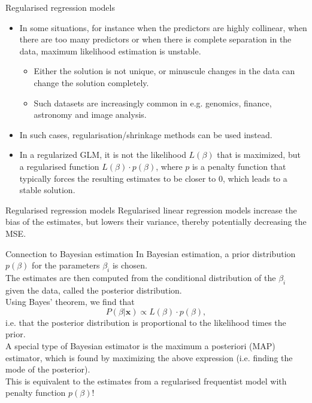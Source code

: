 \documentclass[10pt,handout]{beamer}
\begin{document}
\begin{frame}{Regularised regression models}
\begin{itemize}
\item In some situations, for instance when the predictors are highly collinear, when there are too many predictors or when there is complete separation in the data, maximum likelihood estimation is unstable.\pause
\begin{itemize}
\item Either the solution is not unique, or minuscule changes in the data can change the solution completely.\pause
\item Such datasets are increasingly common in e.g. genomics, finance, astronomy and image analysis.\\[3mm]\pause
\end{itemize}

\item In such cases, {\color{uured}regularisation/shrinkage methods} can be used instead.\\[3mm]\pause
\item In a regularized GLM, it is not the likelihood $L(\beta)$ that is maximized, but a {\color{uured}regularised} function $L(\beta) \cdot p(\beta)$, where $p$ is a penalty function that typically forces the resulting estimates to be closer to 0, which leads to a stable solution.
\end{itemize}
\end{frame}

\begin{frame}{Regularised regression models}
Regularised linear regression models increase the {\color{uured}bias} of the estimates, but lowers their {\color{uured}variance}, thereby potentially decreasing the MSE.
\end{frame}

\begin{frame}{Connection to Bayesian estimation}
In Bayesian estimation, a {\color{uured}prior distribution} $p(\beta)$ for the parameters $\beta_i$ is chosen.\\[3mm]\pause
The estimates are then computed from the conditional distribution of the $\beta_i$ given the data, called the {\color{uured}posterior distribution}.\\[3mm]\pause
Using Bayes' theorem, we find that
$$P(\beta|\mathbf{x})\propto L(\beta)\cdot p(\beta),$$
i.e. that the posterior distribution is proportional to the likelihood times the prior.\\[3mm]
A special type of Bayesian estimator is the {\color{uured}maximum a posteriori (MAP)} estimator, which is found by maximizing the above expression (i.e. finding the mode of the posterior).\\[3mm]
This is equivalent to the estimates from a regularised frequentist model with penalty function $p(\beta)$!
\end{frame}
\end{document}
